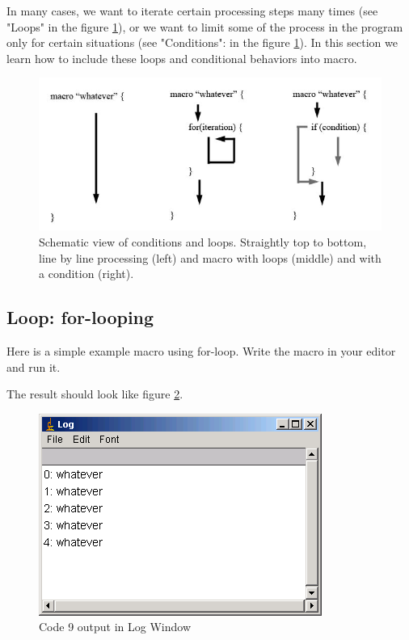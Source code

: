 In many cases, we want to iterate certain processing steps many times (see "Loops" in the figure \ref{fig_scriptscheme}), or we want to limit some of the process in the program only for certain situations (see "Conditions": in the figure \ref{fig_scriptscheme}). In this section we learn how to include these loops and conditional behaviors into macro. 

\begin{figure}[htbp]
\begin{center}
\includegraphics[width=\textwidth]{fig/fig23_1_ScriptSchemes.png}
\caption{Schematic view of conditions and loops. Straightly top to bottom, line by line processing (left) and macro with loops (middle) and with a condition (right).} \label{fig_scriptscheme}
\end{center}
\end{figure}

\subsection{Loop: for-looping}
Here is a simple example macro using for-loop. Write the macro in your editor and run it. 

The result should look like figure \ref{fig_whateverOut}.

\begin{figure}[h!]
\begin{center}
\includegraphics[scale=0.6]{fig/fig2311_whatever5.png}
\caption{Code 9 output in Log Window}
\label{fig_whateverOut}
\end{center}
\end{figure}

